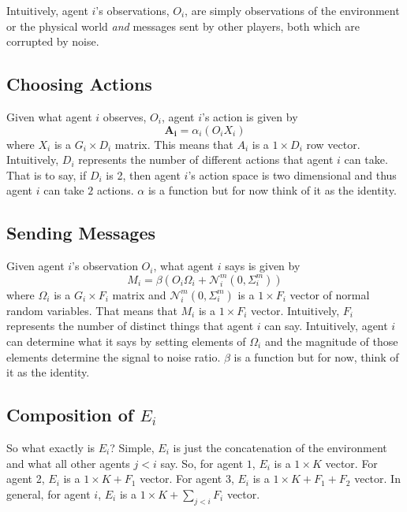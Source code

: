 \documentclass{article}
\begin{document}
Intuitively, agent $i$'s observations, $O_i$, are simply observations
of the environment or the physical world \emph{and} messages sent by
other players, both which are corrupted by noise.  


\subsection{Choosing Actions}


Given what agent $i$ observes, $O_i$, agent $i$'s action is given by
\begin{equation}
  \mathbf{A_{i}} = \alpha_i(O_iX_i)
\end{equation}
where $X_i$ is a $G_i\times D_i$ matrix.  This means that $A_i$ is a
$1\times D_i$ row vector.  Intuitively, $D_i$ represents the number of
different actions that agent $i$ can take.  That is to say, if $D_i$
is 2, then agent $i$'s action space is two dimensional and thus agent
$i$ can take $2$ actions.  $\alpha$ is a function but for now think of
it as the identity.  

\subsection{Sending Messages}
Given agent $i$'s observation $O_i$, what agent $i$ says is given by
\begin{equation}
M_i = \beta(O_i\Omega_i + \mathcal{N}^m_{i}(0, \Sigma^m_{i}))
\end{equation}
where $\Omega_i$ is a $G_i\times F_i$ matrix and $\mathcal{N}^m_{i}(0,
\Sigma^m_{i})$ is a $1\times F_i$ vector of normal random
variables.  That means that $M_i$ is a $1\times F_i$ vector.
Intuitively, $F_i$ represents the number of distinct things that agent
$i$ can say.  Intuitively, agent $i$ can determine what it says by
setting elements of $\Omega_i$ and the magnitude of those elements
determine the signal to noise ratio.  $\beta$ is a function but for
now, think of it as the identity.

\subsection{Composition of $E_i$}
So what exactly is $E_i$?  Simple, $E_i$ is just the concatenation of
the environment and what all other agents $j<i$ say.  So, for agent
$1$, $E_i$ is a $1\times K$ vector.  For agent 2, $E_i$ is a $1\times
K + F_1$ vector.  For agent $3$, $E_i$ is a $1\times K + F_1 +F_2$ 
vector.  In general, for agent $i$, $E_i$ is a $1\times K +
\sum_{j<i}F_i$ vector.
\end{document}
